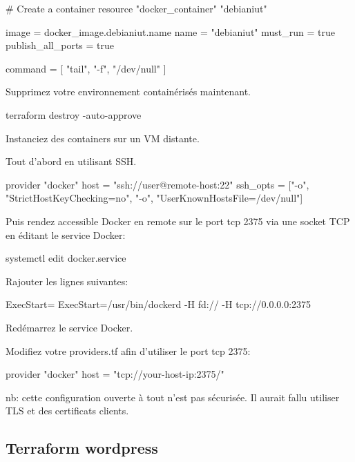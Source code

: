 \begin{questions}
\begin{solution}
\begin{terraformcode}
      # Create a container
      resource "docker_container" "debianiut" {
        image = docker_image.debianiut.name
        name  = "debianiut"
        must_run          = true
        publish_all_ports = true
      
        command = [
          "tail",
          "-f",
          "/dev/null"
        ]
      }
\end{terraformcode}
\end{solution}

\question Supprimez votre environnement containérisés maintenant.

\begin{bashcode}
terraform destroy -auto-approve 
\end{bashcode}

\question  Instanciez des containers sur un VM distante.

Tout d'abord en utilisant SSH.
 
\begin{terraformcode}
provider "docker" {
        host     = "ssh://user@remote-host:22"
        ssh_opts = ["-o", "StrictHostKeyChecking=no", "-o", "UserKnownHostsFile=/dev/null"]
}
\end{terraformcode}


Puis rendez accessible Docker en remote sur le port tcp 2375 via une socket TCP en éditant le service Docker:

\begin{bashcode}
systemctl edit docker.service    
\end{bashcode}
Rajouter les lignes suivantes:
\begin{inicode}
[Service]
ExecStart=
ExecStart=/usr/bin/dockerd -H fd:// -H tcp://0.0.0.0:2375
\end{inicode}
Redémarrez le service Docker.


Modifiez votre providers.tf afin d'utiliser le port tcp 2375:
\begin{terraformcode}
    provider "docker" {
      host = "tcp://your-host-ip:2375/"
    }
\end{terraformcode}
nb: cette configuration ouverte à tout n'est pas sécurisée. Il aurait fallu 
utiliser TLS et des certificats clients.

\end{questions}



\subsection{Terraform wordpress} 

